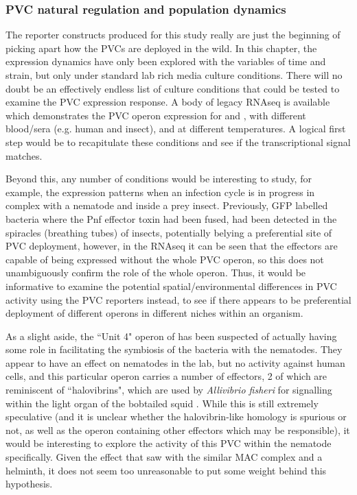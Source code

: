 \subsubsection{PVC natural regulation and population dynamics}
The reporter constructs produced for this study really are just the beginning of picking apart how the PVCs are deployed in the wild. In this chapter, the expression dynamics have only been explored with the variables of time and strain, but only under standard lab rich media culture conditions. There will no doubt be an effectively endless list of culture conditions that could be tested to examine the PVC expression response. A body of legacy RNAseq is available which demonstrates the PVC operon expression for \Pasy{} and \Plum, with different blood/sera (e.g. human and insect), and at different temperatures. A logical first step would be to recapitulate these conditions and see if the transcriptional signal matches.

Beyond this, any number of conditions would be interesting to study, for example, the expression patterns when an infection cycle is in progress in complex with a nematode and inside a prey insect. Previously, GFP labelled bacteria where the Pnf effector toxin had been fused, had been detected in the spiracles (breathing tubes) of insects, potentially belying a preferential site of PVC deployment, however, in the RNAseq it can be seen that the effectors are capable of being expressed without the whole PVC operon, so this does not unambiguously confirm the role of the whole operon. Thus, it would be informative to examine the potential spatial/environmental differences in PVC activity using the PVC reporters instead, to see if there appears to be preferential deployment of different operons in different niches within an organism.

As a slight aside, the ``Unit 4" operon of \Plum{} has been suspected of actually having some role in facilitating the symbiosis of the bacteria with the nematodes. They appear to have an effect on nematodes in the lab, but no activity against human cells, and this particular operon carries a number of effectors, 2 of which are reminiscent of ``halovibrins", which are used by \emph{Allivibrio fisheri} for signalling within the light organ of the bobtailed squid \citep{Stabb2001, Reich1996}. While this is still extremely speculative (and it is unclear whether the halovibrin-like homology is spurious or not, as well as the operon containing other effectors which may be responsible), it would be interesting to explore the activity of this PVC within the nematode specifically. Given the effect that \cite{Shikuma2014} saw with the similar MAC complex and a helminth, it does not seem too unreasonable to put some weight behind this hypothesis.

